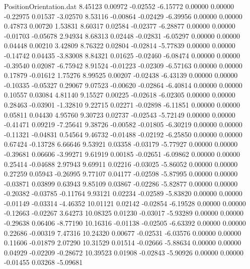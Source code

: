 \begin{filecontents}{PositionOrientation.dat}
   8.45123    0.00972   -0.02552    -6.15772    0.00000    0.00000   -0.22975    0.01537   -3.02570
   8.53116   -0.00864   -0.02429    -6.39956    0.00000    0.00000    0.47873    0.00720    1.53831
   8.60317    0.02584   -0.02377    -6.28877    0.00000    0.00000   -0.01703   -0.05678    2.94934
   8.68313    0.02448   -0.02831    -6.05297    0.00000    0.00000    0.04448    0.00210    3.42809
   8.76322    0.02804   -0.02814    -5.77839    0.00000    0.00000   -0.14742    0.04435   -3.83008
   8.84321    0.01625   -0.02460    -6.08474    0.00000    0.00000   -0.39540    0.02087   -6.75942
   8.91524   -0.01223   -0.02309    -6.57163    0.00000    0.00000    0.17879   -0.01612    1.75276
   8.99525    0.00207   -0.02438    -6.43139    0.00000    0.00000   -0.10335   -0.05327    0.29067
   9.07523   -0.00620   -0.02864    -6.40814    0.00000    0.00000    0.10557    0.03084    4.81140
   9.15527    0.00225   -0.02618    -6.02305    0.00000    0.00000    0.28463   -0.03901   -1.32810
   9.22715    0.02271   -0.02898    -6.11851    0.00000    0.00000    0.05811    0.04430    4.95760
   9.30723    0.02737   -0.02543    -5.72149    0.00000    0.00000   -0.41471    0.09219   -7.25641
   9.38726   -0.00582   -0.01805    -6.30219    0.00000    0.00000   -0.11321   -0.04831    0.54564
   9.46732   -0.01488   -0.02192    -6.25850    0.00000    0.00000    0.67424   -0.13728    6.66646
   9.53921    0.03358   -0.03179    -5.77927    0.00000    0.00000   -0.39681    0.06606   -3.99271
   9.61919    0.00185   -0.02651    -6.09862    0.00000    0.00000    0.25414   -0.04688    2.97943
   9.69911    0.02216   -0.03025    -5.86052    0.00000    0.00000    0.27259    0.05943   -0.26995
   9.77107    0.04177   -0.02598    -5.87995    0.00000    0.00000   -0.03871    0.03899    0.63943
   9.85109    0.03867   -0.02286    -5.82877    0.00000    0.00000   -0.20382   -0.03785   -0.11764
   9.93121    0.02234   -0.02589    -5.83820    0.00000    0.00000   -0.01149   -0.03314   -4.46352
  10.01121    0.02142   -0.02854    -6.19528    0.00000    0.00000   -0.12663   -0.02267    3.64273
  10.08325    0.01230   -0.03017    -5.93289    0.00000    0.00000   -0.29638    0.06406   -8.77190
  10.16316   -0.01138   -0.02505    -6.63392    0.00000    0.00000    0.22686   -0.00319    7.47316
  10.24320    0.00677   -0.02531    -6.03576    0.00000    0.00000    0.11606   -0.01879    2.07290
  10.31529    0.01514   -0.02666    -5.88634    0.00000    0.00000    0.04929   -0.02209   -0.28672
  10.39523    0.01908   -0.02843    -5.90926    0.00000    0.00000   -0.01455    0.03268   -5.09681

\end{filecontents}
